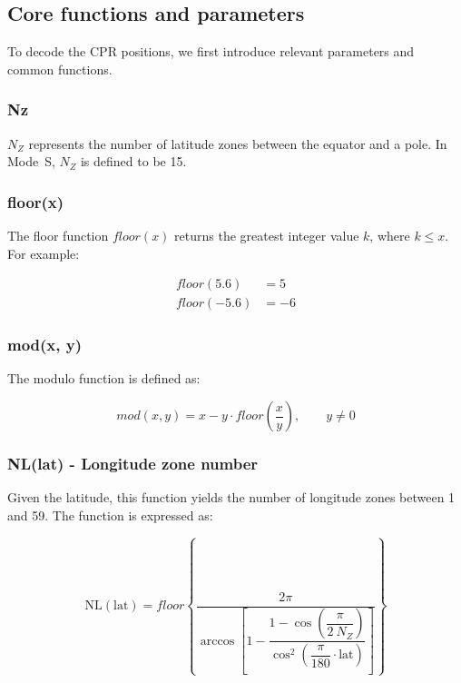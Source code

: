 \subsection{Core functions and parameters}
To decode the CPR positions, we first introduce relevant parameters and common functions.

\subsubsection{Nz}

$N_Z$ represents the number of latitude zones between the equator and a pole. In Mode~S, $N_Z$ is defined to be 15.

\subsubsection{floor(x)}

The floor function $floor(x)$ returns the greatest integer value $k$, where $k \le x$. For example:

\begin{equation}
  \begin{split}
    floor(5.6) &= 5 \\
    floor(-5.6) &= -6
  \end{split}
\end{equation}

\subsubsection{mod(x, y)}

The modulo function is defined as:

\begin{equation}
  mod(x,y) = x - y \cdot floor \left( \frac{x}{y} \right), \qquad y \ne 0
\end{equation}

\subsubsection{NL(lat) - Longitude zone number}

Given the latitude, this function yields the number of longitude zones between 1 and 59. The function is expressed as:

\begin{equation}
  \mathrm{NL}(\mathrm{lat}) = floor \left\{ \dfrac{2 \pi}{\arccos \left[ 1 - \dfrac{1-\cos \left( \dfrac{\pi}{2~N_Z} \right)}{\cos^2\left(\dfrac{\pi}{180} \cdot \mathrm{lat} \right)} \right] } \right\}
\end{equation}

